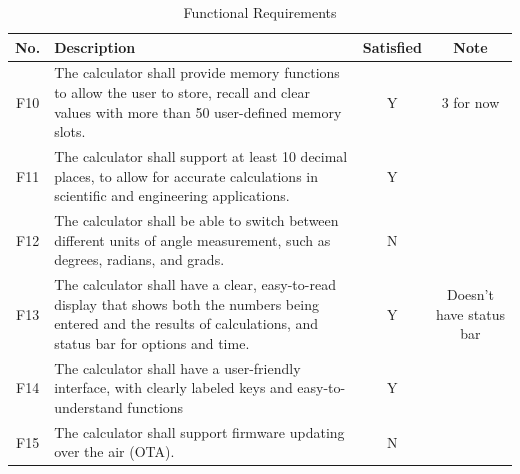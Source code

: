 \documentclass[a4paper, twoside]{report}
\begin{document}
\newpage
\begin{table}[H]
\centering
\begin{tabular}{|c{}|p{}|c{}|c{}|}
\hline
\textbf{No.} & \textbf{Description} & \textbf{Satisfied} & \textbf{Note} \\ \hline
F10 & The calculator shall provide memory functions to allow the user to store, recall and clear values with more than 50 user-defined memory slots.                                                                                                                                                                                                                              & Y                       & 3 for now \\ \hline
F11 & The calculator shall support at least 10 decimal places, to allow for accurate calculations in scientific and engineering applications.                                                                                                                                                                                                                                     & Y                     &  \\ \hline
F12 & The calculator shall be able to switch between different units of angle measurement, such as degrees, radians, and grads.                                                                                                                                                                                                                                                   & N                     &  \\ \hline
F13 & The calculator shall have a clear, easy-to-read display that shows both the numbers being entered and the results of calculations, and status bar for options and time.                                                                                                                                                                                                     & Y                          & Doesn't have status bar \\ \hline
F14 & The calculator shall have a user-friendly interface, with clearly labeled keys and easy-to-understand functions                                                                                                                                                                                                                                                             & Y              &  \\ \hline
F15 & The calculator shall support firmware updating over the air (OTA).                                                                                                                                                                                                                                                                                                          & N                     &  \\ \hline
\end{tabular}
\caption{Functional Requirements}
\end{table}
\end{document}
